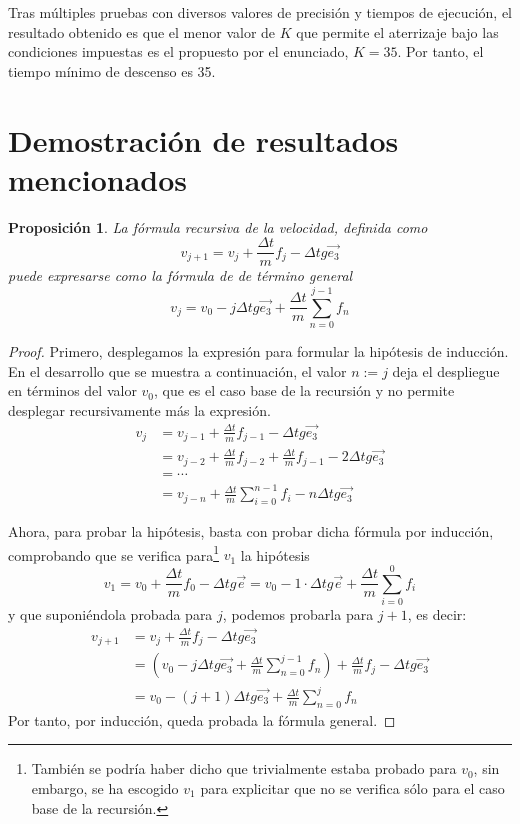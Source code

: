 \documentclass[10pt,a4paper]{article}
\newtheorem{proposicion}{Proposición}[section]
\begin{document}
Tras múltiples pruebas con diversos valores de precisión y tiempos de ejecución, el resultado obtenido es que el menor valor de $K$ que permite el aterrizaje bajo las condiciones impuestas es el propuesto por el enunciado, $K=35$. Por tanto, el tiempo mínimo de descenso es 35.




\appendix

\section{Demostración de resultados mencionados}

\begin{proposicion}
\label{prop:v_k}
La fórmula recursiva de la velocidad, definida como
\[
v_{j+1} = v_{j} + \frac{\Delta t}{m}f_j - \Delta t g \vec{e_3}
\]
puede expresarse como la fórmula de de término general
\[
v_j = v_0 - j\Delta t g \vec{e_3} + \frac{\Delta t}{m} \sum_{n=0}^{j-1} f_n
\]
\end{proposicion}
\begin{proof}
Primero, desplegamos la expresión para formular la hipótesis de inducción. En el desarrollo que se muestra a continuación, el valor $n := j$ deja el despliegue en términos del valor $v_0$, que es el caso base de la recursión y no permite desplegar recursivamente más la expresión.
\begin{align*}
v_{j} &= v_{j-1} + \frac{\Delta t}{m}f_{j-1} - \Delta t g \vec{e_3} \\
	  &= v_{j-2} + \frac{\Delta t}{m}f_{j-2} + \frac{\Delta t}{m}f_{j-1} - 2\Delta t g \vec{e_3} \\
	  &= \cdots \\
	  &= v_{j-n} +  \frac{\Delta t}{m}\sum_{i=0}^{n-1}f_i - n\Delta t g \vec{e_3}
\end{align*}

Ahora, para probar la hipótesis, basta con probar dicha fórmula por inducción, comprobando que se verifica para\footnote{También se podría haber dicho que trivialmente estaba probado para $v_0$, sin embargo, se ha escogido $v_1$ para explicitar que no se verifica sólo para el caso base de la recursión.} $v_1$ la hipótesis
\[
v_1 = v_0 + \frac{\Delta t}{m} f_0 - \Delta t g \vec{e} = v_0 - 1 \cdot \Delta t g \vec{e} + \frac{\Delta t}{m} \sum_{i=0}^0 f_i
\]
y que suponiéndola probada para $j$, podemos probarla para $j+1$, es decir:
\begin{align*}
v_{j+1} &= v_{j} + \frac{\Delta t}{m}f_{j} - \Delta t g \vec{e_3} \\
	  &= \left(v_0 - j\Delta t g \vec{e_3} + \frac{\Delta t}{m} \sum_{n=0}^{j-1} f_n\right) +  \frac{\Delta t}{m} f_j - \Delta t g \vec{e_3} \\
	  &= v_0 - (j+1)\Delta t g \vec{e_3} + \frac{\Delta t}{m}\sum_{n=0}^j f_n
\end{align*}
Por tanto, por inducción, queda probada la fórmula general.
\end{proof}
\end{document}
